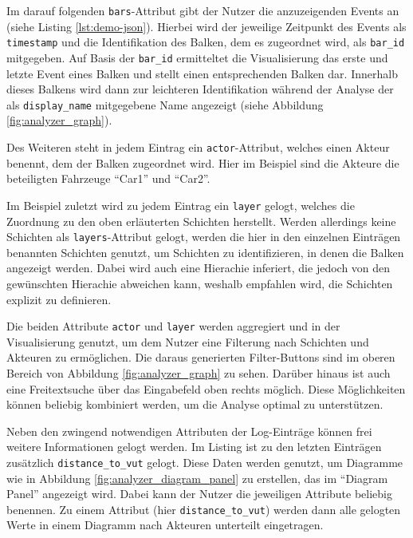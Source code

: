 Im darauf folgenden \texttt{bars}-Attribut gibt der Nutzer die anzuzeigenden Events an (siehe Listing \ref{lst:demo-json}). Hierbei wird der jeweilige Zeitpunkt des Events als \texttt{timestamp} und die Identifikation des Balken, dem es zugeordnet wird, als \texttt{bar\_id} mitgegeben. Auf Basis der \texttt{bar\_id} ermitteltet die Visualisierung das erste und letzte Event eines Balken und stellt einen entsprechenden Balken dar. Innerhalb dieses Balkens wird dann zur leichteren Identifikation während der Analyse der als \texttt{display\_name} mitgegebene Name angezeigt (siehe Abbildung \ref{fig:analyzer_graph}).

Des Weiteren steht in jedem Eintrag ein \texttt{actor}-Attribut, welches einen Akteur benennt, dem der Balken zugeordnet wird. Hier im Beispiel sind die Akteure die beteiligten Fahrzeuge \enquote{Car1} und \enquote{Car2}.

Im Beispiel zuletzt wird zu jedem Eintrag ein \texttt{layer} gelogt, welches die Zuordnung zu den oben erläuterten Schichten herstellt. Werden allerdings keine Schichten als \texttt{layers}-Attribut gelogt, werden die hier in den einzelnen Einträgen benannten Schichten genutzt, um Schichten zu identifizieren, in denen die Balken angezeigt werden. Dabei wird auch eine Hierachie inferiert, die jedoch von den gewünschten Hierachie abweichen kann, weshalb empfahlen wird, die Schichten explizit zu definieren.

Die beiden Attribute \texttt{actor} und \texttt{layer} werden aggregiert und in der Visualisierung genutzt, um dem Nutzer eine Filterung nach Schichten und Akteuren zu ermöglichen. Die daraus generierten Filter-Buttons sind im oberen Bereich von Abbildung \ref{fig:analyzer_graph} zu sehen.
Darüber hinaus ist auch eine Freitextsuche über das Eingabefeld oben rechts möglich. Diese Möglichkeiten können beliebig kombiniert werden, um die Analyse optimal zu unterstützen.

Neben den zwingend notwendigen Attributen der Log-Einträge können frei weitere Informationen gelogt werden. Im Listing
ist zu den letzten Einträgen zusätzlich \texttt{distance\_to\_vut} gelogt. Diese Daten werden genutzt, um Diagramme wie in Abbildung \ref{fig:analyzer_diagram_panel} zu erstellen, das im \enquote{Diagram Panel} angezeigt wird. Dabei kann der Nutzer die jeweiligen Attribute beliebig benennen. Zu einem Attribut (hier \texttt{distance\_to\_vut}) werden dann alle gelogten Werte in einem Diagramm nach Akteuren unterteilt eingetragen.

